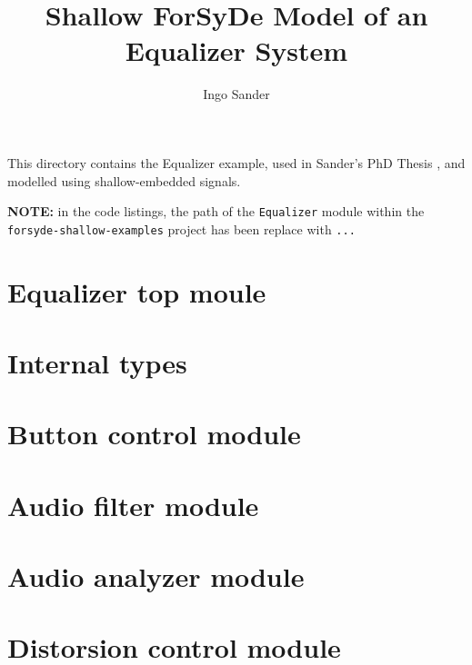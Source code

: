 \documentclass{article}
\title{Shallow ForSyDe Model of an Equalizer System}
\author{Ingo Sander}
\begin{document}
\maketitle

This directory contains the Equalizer example, used in Sander's PhD Thesis \cite{San03}, and modelled using shallow-embedded signals. 

\begin{framed}
  \textbf{NOTE:} in the code listings, the path of the \texttt{Equalizer} module within the \texttt{forsyde-shallow-examples} project has been replace with \texttt{...}
\end{framed}


\section{Equalizer top moule}
\label{sec:equalizer-top-moule}


\section{Internal types}
\label{sec:internal-types}


\section{Button control module}
\label{sec:butt-contr-module}


\section{Audio filter module}
\label{sec:audio-filter-module}


\section{Audio analyzer module}
\label{sec:audio-analyz-module}


\section{Distorsion control module}
\label{sec:dist-contr-module}




\printbibliography
\end{document}
